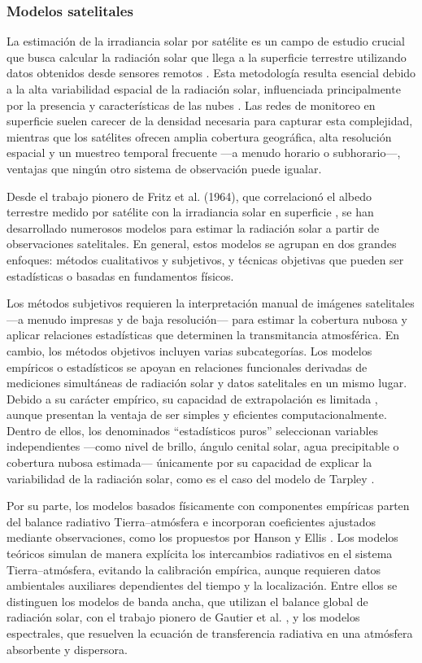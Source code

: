 \subsubsection{Modelos satelitales}

La estimación de la irradiancia solar por satélite es un campo de estudio crucial que busca calcular la radiación solar que llega a la superficie terrestre utilizando datos obtenidos desde sensores remotos \cite{Hay1993, ALONSOSUAREZ2012}. Esta metodología resulta esencial debido a la alta variabilidad espacial de la radiación solar, influenciada principalmente por la presencia y características de las nubes \cite{Laguarda2022}. Las redes de monitoreo en superficie suelen carecer de la densidad necesaria para capturar esta complejidad, mientras que los satélites ofrecen amplia cobertura geográfica, alta resolución espacial y un muestreo temporal frecuente —a menudo horario o subhorario—, ventajas que ningún otro sistema de observación puede igualar.

Desde el trabajo pionero de Fritz et al. (1964), que correlacionó el albedo terrestre medido por satélite con la irradiancia solar en superficie \cite{Fritz1964}, se han desarrollado numerosos modelos para estimar la radiación solar a partir de observaciones satelitales. En general, estos modelos se agrupan en dos grandes enfoques: métodos cualitativos y subjetivos, y técnicas objetivas que pueden ser estadísticas o basadas en fundamentos físicos.

Los métodos subjetivos requieren la interpretación manual de imágenes satelitales —a menudo impresas y de baja resolución— para estimar la cobertura nubosa y aplicar relaciones estadísticas que determinen la transmitancia atmosférica. En cambio, los métodos objetivos incluyen varias subcategorías. Los modelos empíricos o estadísticos se apoyan en relaciones funcionales derivadas de mediciones simultáneas de radiación solar y datos satelitales en un mismo lugar. Debido a su carácter empírico, su capacidad de extrapolación es limitada \cite{Laguarda2021}, aunque presentan la ventaja de ser simples y eficientes computacionalmente. Dentro de ellos, los denominados “estadísticos puros” seleccionan variables independientes —como nivel de brillo, ángulo cenital solar, agua precipitable o cobertura nubosa estimada— únicamente por su capacidad de explicar la variabilidad de la radiación solar, como es el caso del modelo de Tarpley \cite{Tarpley1979}.

Por su parte, los modelos basados físicamente con componentes empíricas parten del balance radiativo Tierra–atmósfera e incorporan coeficientes ajustados mediante observaciones, como los propuestos por Hanson \cite{Hanson1976} y Ellis \cite{Ellis1978}. Los modelos teóricos simulan de manera explícita los intercambios radiativos en el sistema Tierra–atmósfera, evitando la calibración empírica, aunque requieren datos ambientales auxiliares dependientes del tiempo y la localización. Entre ellos se distinguen los modelos de banda ancha, que utilizan el balance global de radiación solar, con el trabajo pionero de Gautier et al. \cite{Gautier1980}, y los modelos espectrales, que resuelven la ecuación de transferencia radiativa en una atmósfera absorbente y dispersora.

